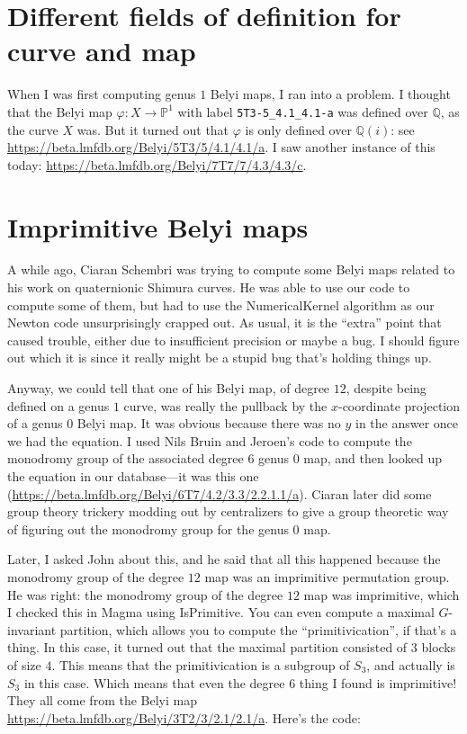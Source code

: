\documentclass[reqno, 12pt]{amsart}
\theoremstyle{definition}
\theoremstyle{remark}
\newcommand{\Q}{\mathbb Q}
\renewcommand{\P}{\mathbb P}
\begin{document}
\section{Different fields of definition for curve and map}

When I was first computing genus $1$ Belyi maps, I ran into a problem. I thought that the Belyi map $\varphi: X \to \P^1$ with label \texttt{5T3-5\_4.1\_4.1-a} was defined over $\Q$, as the curve $X$ was. But it turned out that $\varphi$ is only defined over $\Q(i)$: see \url{https://beta.lmfdb.org/Belyi/5T3/5/4.1/4.1/a}. I saw another instance of this today: \url{https://beta.lmfdb.org/Belyi/7T7/7/4.3/4.3/c}.

%

%



\section{Imprimitive Belyi maps}

A while ago, Ciaran Schembri was trying to compute some Belyi maps related to his work on quaternionic Shimura curves. He was able to use our code to compute some of them, but had to use the \textsf{NumericalKernel} algorithm as our Newton code unsurprisingly crapped out. As usual, it is the ``extra'' point that caused trouble, either due to insufficient precision or maybe a bug. I should figure out which it is since it really might be a stupid bug that's holding things up.

Anyway, we could tell that one of his Belyi map, of degree $12$, despite being defined on a genus $1$ curve, was really the pullback by the $x$-coordinate projection of a genus $0$ Belyi map. It was obvious because there was no $y$ in the answer once we had the equation. I used Nils Bruin and Jeroen's code to compute the monodromy group of the associated degree $6$ genus $0$ map, and then looked up the equation in our database---it was this one (\url{https://beta.lmfdb.org/Belyi/6T7/4.2/3.3/2.2.1.1/a}). Ciaran later did some group theory trickery modding out by centralizers to give a group theoretic way of figuring out the monodromy group for the genus $0$ map.

Later, I asked John about this, and he said that all this happened because the monodromy group of the degree $12$ map was an imprimitive permutation group. He was right: the monodromy group of the degree $12$ map was imprimitive, which I checked this in \textsf{Magma} using \textsf{IsPrimitive}. You can even compute a maximal $G$-invariant partition, which allows you to compute the ``primitivication'', if that's a thing. In this case, it turned out that the maximal partition consisted of $3$ blocks of size $4$. This means that the primitivication is a subgroup of $S_3$, and actually is $S_3$ in this case. Which means that even the degree $6$ thing I found is imprimitive! They all come from the Belyi map \url{https://beta.lmfdb.org/Belyi/3T2/3/2.1/2.1/a}. Here's the code:
\end{document}
